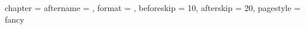 \ctexset
  {
    chapter =
      {
        aftername  = { \hspace{.5\ccwd} },
        format     = { \sffamily\centering\semiLarge },
        beforeskip = { 10\p@ },
        afterskip  = { 20\p@ },
        pagestyle  = { fancy }
      }
  }
\renewcommand\section
  {
    \vspace*{1pt}
    \@startsection {section}{1}{\z@}%
      {0ex}{.8ex}{\sffamily\large}
  }
\renewcommand\subsection
  {
    \vspace*{2pt}
    \@startsection {subsection}{2}{\z@}%
      {0ex}{1.2ex}{\sffamily\semilarge}
  }

\makeatother
\endinput
